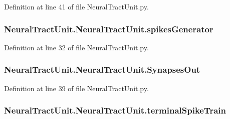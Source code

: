 Definition at line 41 of file Neural\+Tract\+Unit.\+py.

\subsubsection[{\texorpdfstring{spikes\+Generator}{spikesGenerator}}]{\setlength{\rightskip}{0pt plus 5cm}Neural\+Tract\+Unit.\+Neural\+Tract\+Unit.\+spikes\+Generator}\hypertarget{class_neural_tract_unit_1_1_neural_tract_unit_a57cbb130e004fb3f7ee8d8a540f7dff0}{}\label{class_neural_tract_unit_1_1_neural_tract_unit_a57cbb130e004fb3f7ee8d8a540f7dff0}


Definition at line 32 of file Neural\+Tract\+Unit.\+py.

\subsubsection[{\texorpdfstring{Synapses\+Out}{SynapsesOut}}]{\setlength{\rightskip}{0pt plus 5cm}Neural\+Tract\+Unit.\+Neural\+Tract\+Unit.\+Synapses\+Out}\hypertarget{class_neural_tract_unit_1_1_neural_tract_unit_a740d2cfa17ad57c7dbd40fbafc654b95}{}\label{class_neural_tract_unit_1_1_neural_tract_unit_a740d2cfa17ad57c7dbd40fbafc654b95}


Definition at line 39 of file Neural\+Tract\+Unit.\+py.

\subsubsection[{\texorpdfstring{terminal\+Spike\+Train}{terminalSpikeTrain}}]{\setlength{\rightskip}{0pt plus 5cm}Neural\+Tract\+Unit.\+Neural\+Tract\+Unit.\+terminal\+Spike\+Train}\hypertarget{class_neural_tract_unit_1_1_neural_tract_unit_ac34c86235329e753e8cfdfcc1e24c53f}{}\label{class_neural_tract_unit_1_1_neural_tract_unit_ac34c86235329e753e8cfdfcc1e24c53f}


